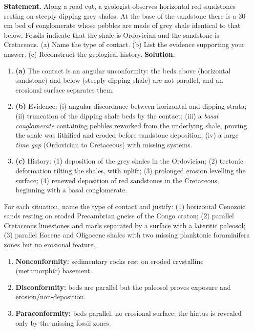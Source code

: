 \documentclass[11pt]{article}
\newcommand{\cle}[1]{{\popxbold\color{popdark}#1}}
\begin{document}
\begin{exoresolu}
\textbf{Statement.} Along a road cut, a geologist observes horizontal red sandstones resting on steeply dipping grey shales. At the base of the sandstone there is a 30 cm bed of conglomerate whose pebbles are made of grey shale identical to that below. Fossils indicate that the shale is Ordovician and the sandstone is Cretaceous. (a) Name the type of contact. (b) List the evidence supporting your answer. (c) Reconstruct the geological history.
\tcblower
\textbf{Solution.}
\begin{enumerate}
\item \textbf{(a)} The contact is an \cle{angular unconformity}: the beds above (horizontal sandstone) and below (steeply dipping shale) are not parallel, and an erosional surface separates them.
\item \textbf{(b)} Evidence: (i) angular discordance between horizontal and dipping strata; (ii) truncation of the dipping shale beds by the contact; (iii) a \emph{basal conglomerate} containing pebbles reworked from the underlying shale, proving the shale was lithified and eroded before sandstone deposition; (iv) a large \emph{time gap} (Ordovician to Cretaceous) with missing systems.
\item \textbf{(c)} History: (1) deposition of the grey shales in the Ordovician; (2) tectonic deformation tilting the shales, with uplift; (3) prolonged erosion levelling the surface; (4) renewed deposition of red sandstones in the Cretaceous, beginning with a basal conglomerate.
\end{enumerate}
\end{exoresolu}

\begin{exercice}
For each situation, name the type of contact and justify: (1) horizontal Cenozoic sands resting on eroded Precambrian gneiss of the Congo craton; (2) parallel Cretaceous limestones and marls separated by a surface with a lateritic paleosol; (3) parallel Eocene and Oligocene shales with two missing planktonic foraminifera zones but no erosional feature.
\end{exercice}

\begin{corrige}[Exercise 1]
\begin{enumerate}
\item \textbf{Nonconformity:} sedimentary rocks rest on eroded crystalline (metamorphic) basement.
\item \textbf{Disconformity:} beds are parallel but the paleosol proves exposure and erosion/non-deposition.
\item \textbf{Paraconformity:} beds parallel, no erosional surface; the hiatus is revealed only by the missing fossil zones.
\end{enumerate}
\end{corrige}
\end{document}
